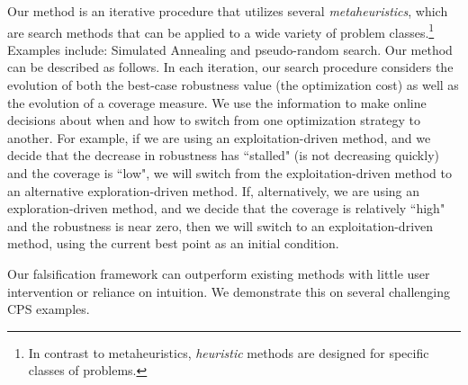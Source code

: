 Our method is an iterative procedure that utilizes several 
\emph{metaheuristics}, which are search methods that can be applied to
a wide variety of problem classes.\footnote{In contrast to metaheuristics, \emph{heuristic} methods are 
designed for specific classes of problems.} Examples include: Simulated Annealing and pseudo-random search. Our method can be described as follows. 
In each iteration, our
search procedure considers the evolution of both the best-case
robustness value (the optimization cost) as well as the evolution of a
coverage measure.  We use the information to make online decisions
about when and how to switch from one optimization strategy to
another.  For example, if we are using an exploitation-driven method,
and we decide that the decrease in robustness has ``stalled" (is not
decreasing quickly) and the coverage is ``low", we will switch from
the exploitation-driven method to an alternative exploration-driven
method.  If, alternatively, we are using an exploration-driven method,
and we decide that the coverage is relatively ``high" and the
robustness is near zero, then we will switch to an exploitation-driven
method, using the current best point as an initial condition.
 
Our falsification framework can outperform existing methods with little user intervention or reliance on intuition. We demonstrate this on several 
challenging CPS examples.







